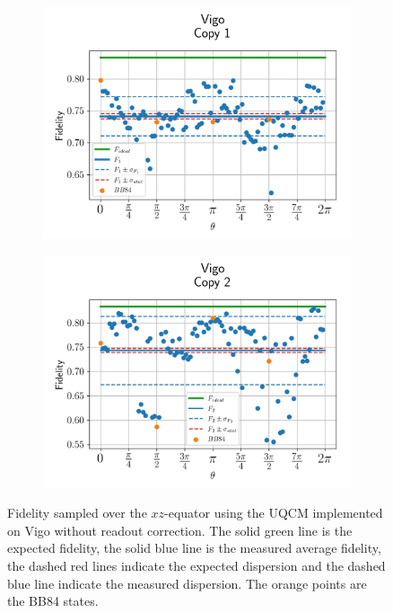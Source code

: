 \begin{figure}[H]
    \centering
    \begin{subfigure}{.45\textwidth}
      \centering
      \includegraphics[width=\textwidth]{Figures/UQCM/IBM/OnlyEquator/results_vigo_copy1.png}
    \end{subfigure}%
    \begin{subfigure}{.45\textwidth}
      \centering
      \includegraphics[width=\textwidth]{Figures/UQCM/IBM/OnlyEquator/results_vigo_copy2.png}
    \end{subfigure}
    \caption{Fidelity sampled over the $xz$-equator using the UQCM implemented on Vigo without readout correction. The solid green line is the expected fidelity, the solid blue line is the measured average fidelity, the dashed red lines indicate the expected dispersion and the dashed blue line indicate the measured dispersion. The orange points are the BB84 states.}
\end{figure}

